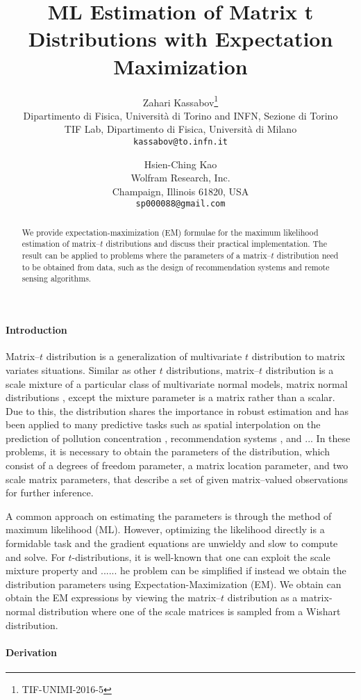 \documentclass[english,listof=totoc]{scrartcl}
\title{ML Estimation of Matrix t Distributions with Expectation Maximization}
\author{Zahari Kassabov\thanks{TIF-UNIMI-2016-5}\\
        Dipartimento di Fisica, Universit\`a di Torino and INFN, Sezione di Torino\\
		TIF Lab, Dipartimento di Fisica, Universit\`a di Milano\\
        \texttt{kassabov@to.infn.it}\\
        \and
        Hsien-Ching Kao\\
        Wolfram Research, Inc.\\
		Champaign, Illinois 61820, USA\\
		\texttt{sp000088@gmail.com}
		}
\begin{document}
\maketitle

\begin{abstract}
We provide expectation-maximization (EM) formulae for the maximum likelihood estimation of matrix--$t$ distributions and discuss their practical implementation. The result can be applied to problems where the parameters of a matrix--$t$ distribution need to be obtained from data, such as the design of recommendation systems and remote sensing algorithms.
\end{abstract}

\paragraph{Introduction}
Matrix--$t$ distribution is a generalization of multivariate $t$ distribution to matrix variates situations. Similar as other $t$ distributions, matrix--$t$ distribution is a scale mixture of a particular class of multivariate normal models, matrix normal distributions \citep{}, except the mixture parameter is a matrix rather than a scalar. Due to this, the distribution shares the importance in robust estimation and has been applied to many predictive tasks such as spatial interpolation on the prediction of pollution concentration \citep{KIBRIA2006785}, recommendation systems \citep{NIPS2007_3203}, and ... In these problems, it is necessary to obtain the parameters of the distribution, which consist of a degrees of freedom parameter, a matrix location parameter, and two scale matrix parameters, that describe a set of given matrix--valued observations for further inference.

A common approach on estimating the parameters is through the method of maximum likelihood (ML). However, optimizing the likelihood directly is a formidable task and the gradient equations are unwieldy and slow to compute and solve. For $t$-distributions, it is well-known that one can exploit the scale mixture property and ...... he problem can be simplified if instead
we obtain the distribution parameters using Expectation-Maximization
(EM). We obtain can obtain the EM expressions by viewing the
matrix--$t$  distribution as a matrix-normal distribution where one of
the scale matrices is sampled from a Wishart distribution.

\paragraph{Derivation}
\end{document}
